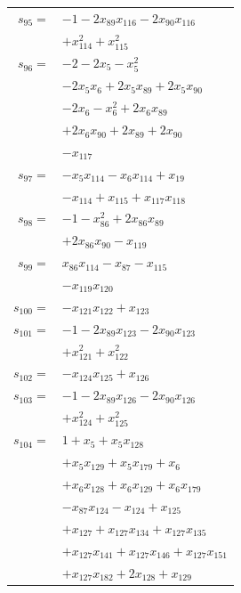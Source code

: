 \begin{longtable}{@{}r@{\;}l@{}}
\(s_{95}=\) & \(\displaystyle -1 -2x_{89}x_{116} -2x_{90}x_{116}\) \\
 & \(\displaystyle +x_{114}^{2} +x_{115}^{2}\) \\[3pt]
\(s_{96}=\) & \(\displaystyle -2 -2x_{5} -x_{5}^{2}\) \\
 & \(\displaystyle -2x_{5}x_{6} +2x_{5}x_{89} +2x_{5}x_{90}\) \\
 & \(\displaystyle -2x_{6} -x_{6}^{2} +2x_{6}x_{89}\) \\
 & \(\displaystyle +2x_{6}x_{90} +2x_{89} +2x_{90}\) \\
 & \(\displaystyle -x_{117}\) \\[3pt]
\(s_{97}=\) & \(\displaystyle -x_{5}x_{114} -x_{6}x_{114} +x_{19}\) \\
 & \(\displaystyle -x_{114} +x_{115} +x_{117}x_{118}\) \\[3pt]
\(s_{98}=\) & \(\displaystyle -1 -x_{86}^{2} +2x_{86}x_{89}\) \\
 & \(\displaystyle +2x_{86}x_{90} -x_{119}\) \\[3pt]
\(s_{99}=\) & \(\displaystyle x_{86}x_{114} -x_{87} -x_{115}\) \\
 & \(\displaystyle -x_{119}x_{120}\) \\[3pt]
\(s_{100}=\) & \(\displaystyle -x_{121}x_{122} +x_{123}\) \\[3pt]
\(s_{101}=\) & \(\displaystyle -1 -2x_{89}x_{123} -2x_{90}x_{123}\) \\
 & \(\displaystyle +x_{121}^{2} +x_{122}^{2}\) \\[3pt]
\(s_{102}=\) & \(\displaystyle -x_{124}x_{125} +x_{126}\) \\[3pt]
\(s_{103}=\) & \(\displaystyle -1 -2x_{89}x_{126} -2x_{90}x_{126}\) \\
 & \(\displaystyle +x_{124}^{2} +x_{125}^{2}\) \\[3pt]
\(s_{104}=\) & \(\displaystyle 1 +x_{5} +x_{5}x_{128}\) \\
 & \(\displaystyle +x_{5}x_{129} +x_{5}x_{179} +x_{6}\) \\
 & \(\displaystyle +x_{6}x_{128} +x_{6}x_{129} +x_{6}x_{179}\) \\
 & \(\displaystyle -x_{87}x_{124} -x_{124} +x_{125}\) \\
 & \(\displaystyle +x_{127} +x_{127}x_{134} +x_{127}x_{135}\) \\
 & \(\displaystyle +x_{127}x_{141} +x_{127}x_{146} +x_{127}x_{151}\) \\
 & \(\displaystyle +x_{127}x_{182} +2x_{128} +x_{129}\) \\

\end{longtable}
